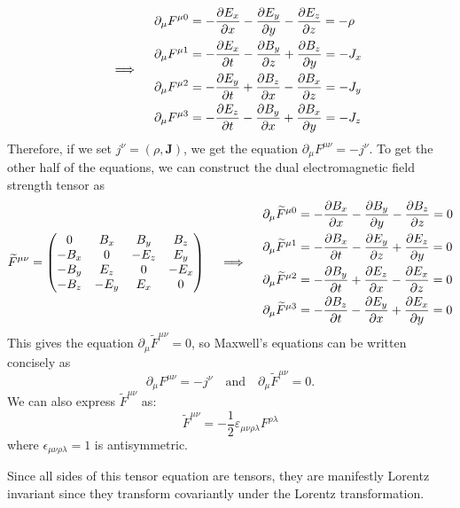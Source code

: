 \documentclass{../../templates/lkx_pset}
\begin{document}
\begin{parts}
\[		\quad\implies\quad
		\begin{aligned}
			\partial_\mu F^{\mu 0} & = -\frac{\partial E_x}{\partial x}-\frac{\partial E_y}{\partial y}-\frac{\partial E_z}{\partial z} = -\rho \\
			\partial_\mu F^{\mu 1} & = -\frac{\partial E_x}{\partial t}-\frac{\partial B_y}{\partial z}+\frac{\partial B_z}{\partial y}= -J_x    \\
			\partial_\mu F^{\mu 2} & = -\frac{\partial E_y}{\partial t}+\frac{\partial B_z}{\partial x}-\frac{\partial B_x}{\partial z}= -J_y    \\
			\partial_\mu F^{\mu 3} & = -\frac{\partial E_z}{\partial t}-\frac{\partial B_y}{\partial x}+\frac{\partial B_x}{\partial y}= -J_z    \\
		\end{aligned}
	\]
	Therefore, if we set $j^\nu = (\rho, \mathbf{J})$, we get the equation $\partial_\mu F^{\mu\nu} = -j^\nu$. To get the other half of the equations, we can construct the dual electromagnetic field strength tensor as
	\[
		\widetilde{F}^{\mu\nu} = \begin{pmatrix}
			0    & B_x  & B_y  & B_z  \\
			-B_x & 0    & -E_z & E_y  \\
			-B_y & E_z  & 0    & -E_x \\
			-B_z & -E_y & E_x  & 0    \\
		\end{pmatrix}
		\quad\implies\quad
		\begin{aligned}
			\partial_\mu \widetilde{F}^{\mu 0} & = -\frac{\partial B_x}{\partial x}-\frac{\partial B_y}{\partial y}-\frac{\partial B_z}{\partial z} = 0 \\
			\partial_\mu \widetilde{F}^{\mu 1}             & = -\frac{\partial B_x}{\partial t}-\frac{\partial E_y}{\partial z}+\frac{\partial E_z}{\partial y}= 0    \\
			\partial_\mu \widetilde{F}^{\mu 2}             & = -\frac{\partial B_y}{\partial t}+\frac{\partial E_z}{\partial x}-\frac{\partial E_x}{\partial z}= 0    \\
			\partial_\mu \widetilde{F}^{\mu 3}             & = -\frac{\partial B_z}{\partial t}-\frac{\partial E_y}{\partial x}+\frac{\partial E_x}{\partial y}= 0    \\
		\end{aligned}
	\]
	This gives the equation $\partial_\mu \widetilde{F}^{\mu\nu}=0$, so Maxwell's equations can be written concisely as
	\[
    \partial_\mu F^{\mu\nu} = -j^\nu\quad\textrm{and}\quad \partial_\mu \widetilde{F}^{\mu\nu} =0.
	\]
	We can also express $\widetilde{F}^{\mu\nu}$ as: \[\widetilde{F}^{\mu\nu}=-\frac{1}{2}\varepsilon_{\mu\nu\rho\lambda} F^{\rho\lambda}\]
	where $\epsilon_{\mu\nu\rho\lambda}=1$ is antisymmetric.

	Since all sides of this tensor equation are tensors, they are manifestly Lorentz invariant since they transform covariantly under the Lorentz transformation.


\end{parts}
\end{document}
